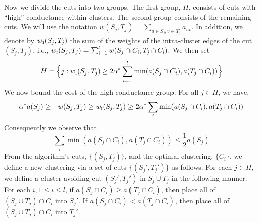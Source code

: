 \documentclass{book}
\numberwithin{exercise}{chapter}
\begin{document}
Now we divide the cuts into two groups. The first group, $H$, consists
of cuts with ``high'' conductance within clusters. The second group consists of
the remaining cuts.
We will use the notation
$w(S_j,T_j)= \sum_{u\in S_j, v\in T_j} a_{uv}$.
In addition, we denote by $w_{\mbox{\tiny I}}(S_j,T_j)$
the sum of the weights of the intra-cluster edges of the cut $(S_j,T_j)$,
i.e., $w_{\mbox{\tiny I}}(S_j,T_j)=\sum_{i=1}^l w(S_j\cap C_i,T_j\cap C_i)$.
We then set
\begin{eqnarray*}
H=\Big\{ j : w_{\mbox{\tiny I}} (S_j,T_j)\geq 2\alpha^* \sum_{i=1}^l
\min (a(S_j\cap C_i),a(T_j\cap C_i))\Big\}
\end{eqnarray*}
We now bound the cost of the high conductance group. For all $j\in H$, we have,
\begin{eqnarray*}
\alpha^* a(S_j) &\geq & w(S_j,T_j) \geq w_{\mbox{\tiny I}}(S_j,T_j) \geq
2\alpha^* \sum_i \min( a(S_j\cap C_i),a(T_j\cap C_i))
\end{eqnarray*}
Consequently we observe that
$$\sum_i  \min(a(S_j\cap C_i),a(T_j\cap C_i)) \leq \frac{1}{2} a(S_j)$$
From the algorithm's cuts, $\{(S_j,T_j)\}$, and the optimal clustering, $\{C_i\}$,
we define a new clustering via a set of cuts $\{(S_j',T_j')\}$ as follows.
For each $j\in H$, we define a cluster-avoiding cut $(S_j',T_j')$ in $S_j\cup T_j$
in the following manner. For each $i,1\leq i\leq l$, if
$a(S_j\cap C_i)\geq a(T_j\cap C_i)$, then place all of
$(S_j\cup T_j)\cap C_i$ into $S_j'$. If
$a(S_j\cap C_i) < a(T_j\cap C_i)$, then place all of
$(S_j\cup T_j)\cap C_i$ into $T_j'$.

\end{document}
